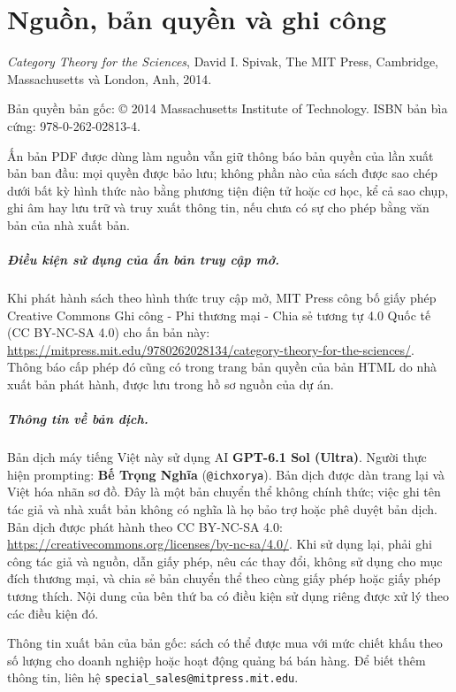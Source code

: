 \chapter*{Nguồn, bản quyền và ghi công}
\begingroup\small
\emph{Category Theory for the Sciences}, David I. Spivak, The MIT Press,
Cambridge, Massachusetts và London, Anh, 2014.

\noindent Bản quyền bản gốc: © 2014 Massachusetts Institute of Technology.
ISBN bản bìa cứng: 978-0-262-02813-4.

Ấn bản PDF được dùng làm nguồn vẫn giữ thông báo bản quyền của lần xuất bản
ban đầu: mọi quyền được bảo lưu; không phần nào của sách được sao chép dưới bất
kỳ hình thức nào bằng phương tiện điện tử hoặc cơ học, kể cả sao chụp, ghi âm
hay lưu trữ và truy xuất thông tin, nếu chưa có sự cho phép bằng văn bản của nhà
xuất bản.

\paragraph{Điều kiện sử dụng của ấn bản truy cập mở.}
Khi phát hành sách theo hình thức truy cập mở, MIT Press công bố giấy
phép Creative Commons Ghi công - Phi thương mại - Chia sẻ tương tự 4.0 Quốc tế
(CC BY-NC-SA 4.0) cho ấn bản này:
\url{https://mitpress.mit.edu/9780262028134/category-theory-for-the-sciences/}.
Thông báo cấp phép đó cũng có trong trang bản quyền của bản HTML do nhà xuất
bản phát hành, được lưu trong hồ sơ nguồn của dự án.

\paragraph{Thông tin về bản dịch.}
Bản dịch máy tiếng Việt này sử dụng AI \textbf{GPT-6.1 Sol (Ultra)}.
Người thực hiện prompting: \textbf{Bế Trọng Nghĩa} (\nolinkurl{@ichxorya}).
Bản dịch được dàn trang lại và Việt hóa nhãn sơ đồ. Đây là một bản chuyển thể không chính thức; việc
ghi tên tác giả và nhà xuất bản không có nghĩa là họ bảo trợ hoặc phê duyệt bản
dịch. Bản dịch được phát hành theo CC BY-NC-SA 4.0:
\url{https://creativecommons.org/licenses/by-nc-sa/4.0/}.
Khi sử dụng lại, phải ghi công tác giả và nguồn, dẫn giấy phép, nêu các thay đổi,
không sử dụng cho mục đích thương mại, và chia sẻ bản chuyển thể theo cùng giấy
phép hoặc giấy phép tương thích. Nội dung của bên thứ ba có điều kiện sử dụng
riêng được xử lý theo các điều kiện đó.

\noindent Thông tin xuất bản của bản gốc: sách có thể được mua với mức chiết
khấu theo số lượng cho doanh nghiệp hoặc hoạt động quảng bá bán hàng. Để biết
thêm thông tin, liên hệ \nolinkurl{special_sales@mitpress.mit.edu}.


